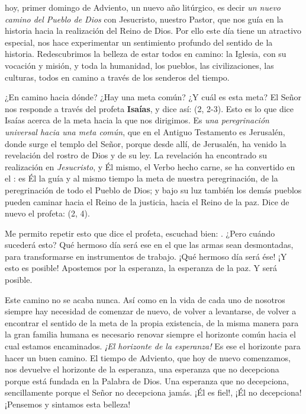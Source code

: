 \begin{body}
	 hoy, primer domingo de Adviento, un nuevo año litúrgico, es decir \emph{un nuevo camino del Pueblo de Dios} con Jesucristo, nuestro Pastor, que nos guía en la historia hacia la realización del Reino de Dios. Por ello este día tiene un atractivo especial, nos hace experimentar un sentimiento profundo del sentido de la historia. Redescubrimos la belleza de estar todos en camino: la Iglesia, con su vocación y misión, y toda la humanidad, los pueblos, las civilizaciones, las culturas, todos en camino a través de los senderos del tiempo.
	
	¿En camino hacia dónde? ¿Hay una meta común? ¿Y cuál es esta meta? El Señor nos responde a través del profeta \textbf{Isaías}, y dice así:  (2, 2-3). Esto es lo que dice Isaías acerca de la meta hacia la que nos dirigimos. Es \emph{una peregrinación universal hacia una meta común}, que en el Antiguo Testamento es Jerusalén, donde surge el templo del Señor, porque desde allí, de Jerusalén, ha venido la revelación del rostro de Dios y de su ley. La revelación ha encontrado su realización en \emph{Jesucristo}, y Él mismo, el Verbo hecho carne, se ha convertido en el : es Él la guía y al mismo tiempo la meta de nuestra peregrinación, de la peregrinación de todo el Pueblo de Dios; y bajo su luz también los demás pueblos pueden caminar hacia el Reino de la justicia, hacia el Reino de la paz. Dice de nuevo el profeta:  (2, 4).
	
	Me permito repetir esto que dice el profeta, escuchad bien: . ¿Pero cuándo sucederá esto? Qué hermoso día será ese en el que las armas sean desmontadas, para transformarse en instrumentos de trabajo. ¡Qué hermoso día será ése! ¡Y esto es posible! Apostemos por la esperanza, la esperanza de la paz. Y será posible.
	
	Este camino no se acaba nunca. Así como en la vida de cada uno de nosotros siempre hay necesidad de comenzar de nuevo, de volver a levantarse, de volver a encontrar el sentido de la meta de la propia existencia, de la misma manera para la gran familia humana es necesario renovar siempre el horizonte común hacia el cual estamos encaminados. \emph{¡El horizonte de la esperanza!} Es ese el horizonte para hacer un buen camino. El tiempo de Adviento, que hoy de nuevo comenzamos, nos devuelve el horizonte de la esperanza, una esperanza que no decepciona porque está fundada en la Palabra de Dios. Una esperanza que no decepciona, sencillamente porque el Señor no decepciona jamás. ¡Él es fiel!, ¡Él no decepciona! ¡Pensemos y sintamos esta belleza!
	

\end{body}
